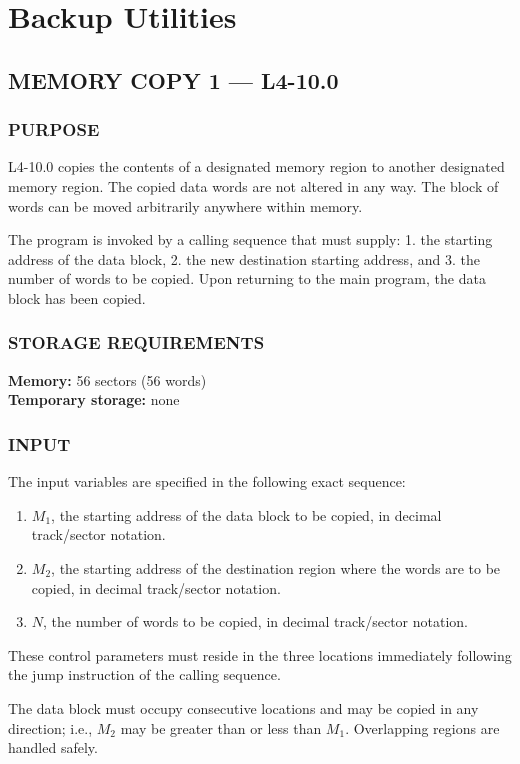 \section{Backup Utilities}
\subsection*{MEMORY COPY 1 --- L4-10.0}

\subsubsection*{PURPOSE}
L4-10.0 copies the contents of a designated memory region to another designated memory region. The copied data words are not altered in any way. The block of words can be moved arbitrarily anywhere within memory.

The program is invoked by a calling sequence that must supply: 1. the starting address of the data block, 2. the new destination starting address, and 3. the number of words to be copied. Upon returning to the main program, the data block has been copied.

\subsubsection*{STORAGE REQUIREMENTS}
\textbf{Memory:} 56 sectors (56 words) \\
\textbf{Temporary storage:} none

\subsubsection*{INPUT}
The input variables are specified in the following exact sequence:
\begin{enumerate}
    \item $M_1$, the starting address of the data block to be copied, in decimal track/sector notation.
    \item $M_2$, the starting address of the destination region where the words are to be copied, in decimal track/sector notation.
    \item $N$, the number of words to be copied, in decimal track/sector notation.
\end{enumerate}

These control parameters must reside in the three locations immediately following the jump instruction of the calling sequence.

The data block must occupy consecutive locations and may be copied in any direction; i.e., $M_2$ may be greater than or less than $M_1$. Overlapping regions are handled safely.

